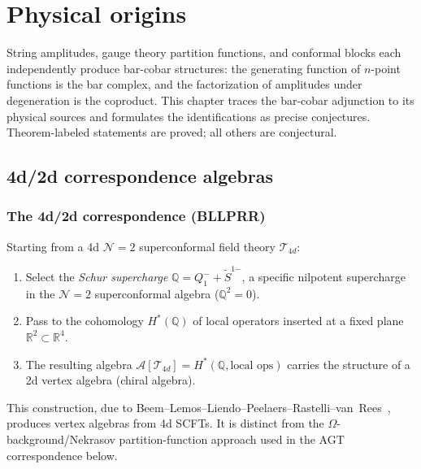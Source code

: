 \chapter{Physical origins}

String amplitudes, gauge theory partition functions, and conformal
blocks each independently produce bar-cobar structures: the
generating function of $n$-point functions is the bar complex, and
the factorization of amplitudes under degeneration is the coproduct.
This chapter traces the bar-cobar adjunction to its physical sources
and formulates the identifications as precise conjectures.
Theorem-labeled statements are proved; all others are conjectural.

\section{4d/2d correspondence algebras}

\subsection{The 4d/2d correspondence (BLLPRR)}

\begin{construction}%
Starting from a 4d $\mathcal{N} = 2$ superconformal field theory $\mathcal{T}_{4d}$:
\begin{enumerate}[label=(\roman*)]
\item Select the \emph{Schur supercharge} $\mathbb{Q} = Q_1^- + \widetilde{S}^{1\dot{-}}$, a specific nilpotent supercharge in the $\mathcal{N}=2$ superconformal algebra ($\mathbb{Q}^2 = 0$).
\item Pass to the cohomology $H^*(\mathbb{Q})$ of local operators inserted at a fixed plane $\mathbb{R}^2 \subset \mathbb{R}^4$.
\item The resulting algebra $\mathcal{A}[\mathcal{T}_{4d}] = H^*(\mathbb{Q}, \text{local ops})$ carries the structure of a 2d vertex algebra (chiral algebra).
\end{enumerate}

This construction, due to Beem--Lemos--Liendo--Peelaers--Rastelli--van~Rees~\cite{beem-et-al}, produces vertex algebras from 4d SCFTs.
It is distinct from the $\Omega$-background/Nekrasov partition-function
approach used in the AGT correspondence below.
\end{construction}

